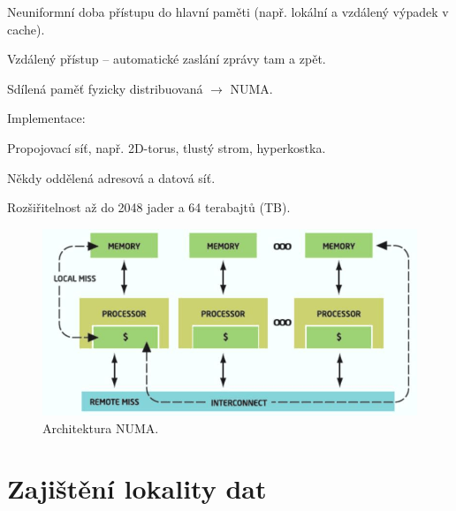 \begin{compactitem}
    \item Neuniformní doba přístupu do hlavní paměti (např. lokální a vzdálený výpadek v cache).

    \item Vzdálený přístup -- automatické zaslání zprávy tam a zpět.

    \item Sdílená paměť fyzicky distribuovaná $\rightarrow$ NUMA.

    \item Implementace: \begin{compactitem}
        \item Propojovací síť, např. 2D-torus, tlustý strom, hyperkostka.
        \item Někdy oddělená adresová a datová síť.
        \item Rozšiřitelnost až do 2048 jader a 64 terabajtů (TB).
    \end{compactitem}

    \begin{figure}[H]
        \centering
        \includegraphics[width=0.9\linewidth]{numa.png}
        \caption{Architektura NUMA.}
    \end{figure}
\end{compactitem}


\section{Zajištění lokality dat}

